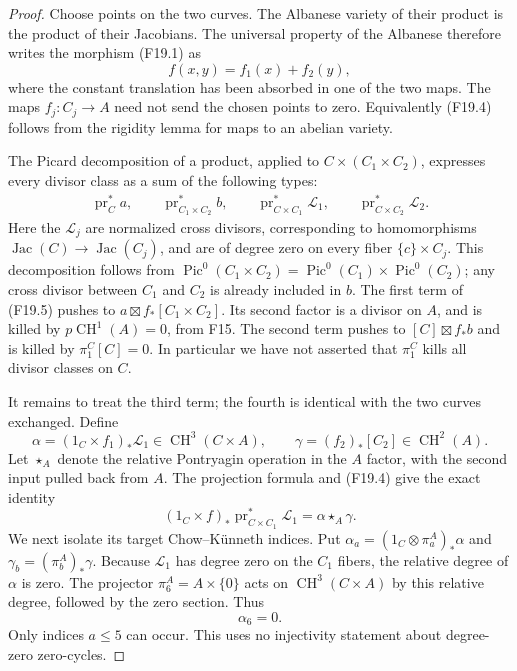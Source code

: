 \documentclass[11pt]{article}
\theoremstyle{remark}\newtheorem{remark}[theorem]{Remark}
\begin{document}
\begin{proof}
Choose points on the two curves.  The Albanese variety of
their product is the product of their Jacobians.  The
universal property of the Albanese therefore writes the
morphism (F19.1) as
\[
                       f(x,y)=f_1(x)+f_2(y),
 \tag{F19.4}
\]
where the constant translation has been absorbed in one
of the two maps.  The maps $f_j:C_j\to A$ need not send
the chosen points to zero.  Equivalently (F19.4) follows
from the rigidity lemma for maps to an abelian variety.

The Picard decomposition of a product, applied to
$C\times(C_1\times C_2)$, expresses every divisor class as
a sum of the following types:
\[
 \begin{gathered}
 \operatorname{pr}_C^*a,\qquad
 \operatorname{pr}_{C_1\times C_2}^*b,\qquad
 \operatorname{pr}_{C\times C_1}^*\mathcal L_1,\qquad
 \operatorname{pr}_{C\times C_2}^*\mathcal L_2. 
 \end{gathered}
 \tag{F19.5}
\]
Here the $\mathcal L_j$ are normalized cross divisors,
corresponding to homomorphisms
$\operatorname{Jac}(C)\to\operatorname{Jac}(C_j)$, and are
of degree zero on every fiber $\{c\}\times C_j$.
This decomposition follows from
$\operatorname{Pic}^0(C_1\times C_2)
 =\operatorname{Pic}^0(C_1)\times\operatorname{Pic}^0(C_2)$;
any cross divisor between $C_1$ and $C_2$ is already included
in $b$.  The first term of (F19.5) pushes to
$a\boxtimes f_*[C_1\times C_2]$.  Its second factor is a
divisor on $A$, and is killed by
$p\operatorname{CH}^1(A)=0$, from F15.  The second term
pushes to $[C]\boxtimes f_*b$ and is killed by
$\pi_1^C[C]=0$.  In particular we have not asserted that
$\pi_1^C$ kills all divisor classes on $C$.

It remains to treat the third term; the fourth is identical
with the two curves exchanged.  Define
\[
 \alpha=(1_C\times f_1)_*\mathcal L_1
                     \in\operatorname{CH}^3(C\times A),
 \qquad
 \gamma=(f_2)_*[C_2]\in\operatorname{CH}^2(A).
 \tag{F19.6}
\]
Let $\star_A$ denote the relative Pontryagin operation in
the $A$ factor, with the second input pulled back from $A$.
The projection formula and (F19.4) give the exact identity
\[
 (1_C\times f)_*\operatorname{pr}_{C\times C_1}^*\mathcal L_1
                          =\alpha\star_A\gamma.
 \tag{F19.7}
\]
We next isolate its target Chow--K\"unneth indices.  Put
$\alpha_a=(1_C\otimes\pi_a^A)_*\alpha$ and
$\gamma_b=(\pi_b^A)_*\gamma$.
Because $\mathcal L_1$ has degree zero on the $C_1$ fibers,
the relative degree of $\alpha$ is zero.  The projector
$\pi_6^A=A\times\{0\}$ acts on
$\operatorname{CH}^3(C\times A)$ by this relative degree,
followed by the zero section.  Thus
\[
                             \alpha_6=0.
 \tag{F19.8}
\]
Only indices $a\le5$ can occur.  This uses no injectivity
statement about degree-zero zero-cycles.


\end{proof}
\end{document}
